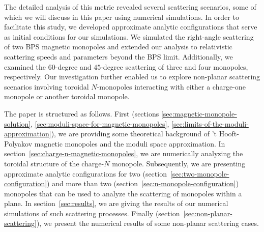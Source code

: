 \documentclass[aps, prd, twocolumn, superscriptaddress, preprintnumbers, nofootinbib, longbibliography]{revtex4-1}
\begin{document}
The detailed analysis of this metric revealed several scattering scenarios, some of which we will discuss in this paper using numerical simulations. In order to facilitate this study, we developed approximate analytic configurations that serve as initial conditions for our simulations.
We simulated the right-angle scattering of two BPS magnetic monopoles and extended our analysis to relativistic scattering speeds and parameters beyond the BPS limit.
Additionally, we examined the $60$-degree and $45$-degree scattering of three and four monopoles, respectively. Our investigation further enabled us to explore non-planar scattering scenarios involving toroidal $N$-monopoles interacting with either a charge-one monopole or another toroidal monopole.

The paper is structured as follows. First (sections \ref{sec:magnetic-monopole-solution}, \ref{sec:moduli-space-for-magnetic-monopoles}, \ref{sec:limits-of-the-moduli-approximation}), we are providing some theoretical background of 't Hooft-Polyakov magnetic monopoles and the moduli space approximation. In section~\ref{sec:charge-n-magnetic-monopoles}, we are numerically analyzing the toroidal structure of the charge-$N$ monopole. Subsequently, we are presenting approximate analytic configurations for two (section~\ref{sec:two-monopole-configuration}) and more than two (section~\ref{sec:n-monopole-configuration}) monopoles that can be used to analyze the scattering of monopoles within a plane. In section~\ref{sec:results}, we are giving the results of our numerical simulations of such scattering processes. Finally  (section~\ref{sec:non-planar-scattering}), we present the numerical results of some non-planar scattering cases.
\end{document}
